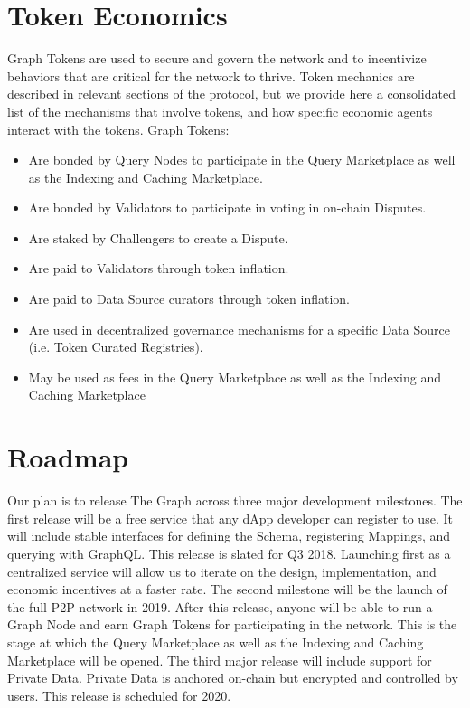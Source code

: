 \documentclass[12pt]{article}
\begin{document}
\section{Token Economics}
Graph Tokens are used to secure and govern the network and to incentivize behaviors that are critical for the network to thrive. Token mechanics are described in relevant sections of the protocol, but we provide here a consolidated list of the mechanisms that involve tokens, and how specific economic agents interact with the tokens. Graph Tokens:
\begin{itemize}
\item Are bonded by Query Nodes to participate in the Query Marketplace as well as the Indexing and Caching Marketplace.
\item Are bonded by Validators to participate in voting in on-chain Disputes.
\item Are staked by Challengers to create a Dispute.
\item Are paid to Validators through token inflation.
\item Are paid to Data Source curators through token inflation.
\item Are used in decentralized governance mechanisms for a specific Data Source (i.e. Token Curated Registries).
\item May be used as fees in the Query Marketplace as well as the Indexing and Caching Marketplace
\end{itemize}
\section{Roadmap}
Our plan is to release The Graph across three major development milestones. The first release will be a free service that any dApp developer can register to use. It will include stable interfaces for defining the Schema, registering Mappings, and querying with GraphQL. This release is slated for Q3 2018. Launching first as a centralized service will allow us to iterate on the design, implementation, and economic incentives at a faster rate. The second milestone will be the launch of the full P2P network in 2019. After this release, anyone will be able to run a Graph Node and earn Graph Tokens for participating in the network. This is the stage at which the Query Marketplace as well as the Indexing and Caching Marketplace will be opened. The third major release will include support for Private Data. Private Data is anchored on-chain but encrypted and controlled by users. This release is scheduled for 2020.
\end{document}
